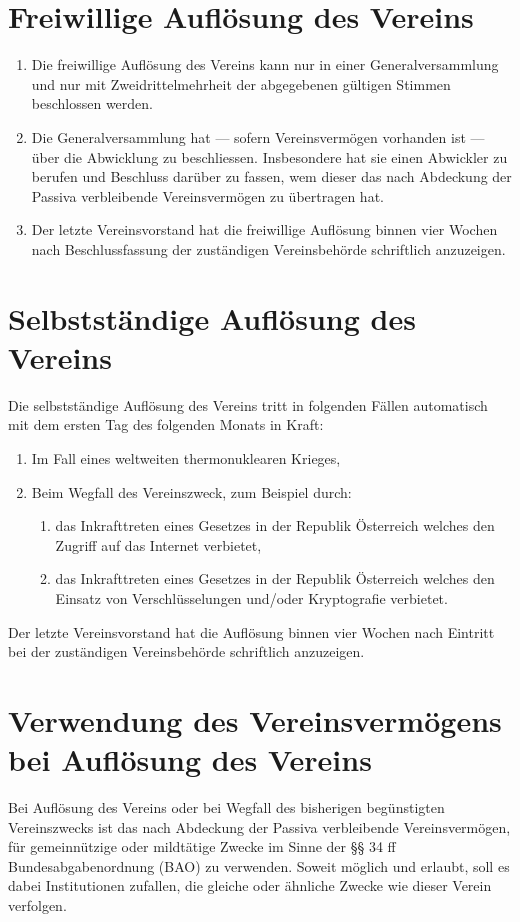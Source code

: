 \documentclass[a4paper,12pt]{article}
\begin{document}
	\section{Freiwillige Auflösung des Vereins}
		\label{sec:freiwillige-aufloesung}
		\begin{enumerate}
			\item Die freiwillige Auflösung des Vereins kann nur in einer Generalversammlung und nur mit Zweidrittelmehrheit der abgegebenen gültigen Stimmen beschlossen werden.
			\item Die Generalversammlung hat --- sofern Vereinsvermögen vorhanden ist --- über die Abwicklung zu beschliessen. Insbesondere hat sie einen Abwickler zu berufen und Beschluss darüber zu fassen, wem dieser das nach Abdeckung der Passiva verbleibende Vereinsvermögen zu übertragen hat.
			\item Der letzte Vereinsvorstand hat die freiwillige Auflösung binnen vier Wochen nach Beschlussfassung der zuständigen Vereinsbehörde schriftlich anzuzeigen.
		\end{enumerate}

	\section{Selbstständige Auflösung des Vereins}
		Die selbstständige Auflösung des Vereins tritt in folgenden Fällen automatisch mit dem ersten Tag des folgenden Monats in Kraft:
		\begin{enumerate}
			\item Im Fall eines weltweiten thermonuklearen Krieges,
			\item Beim Wegfall des Vereinszweck, zum Beispiel durch:
			\begin{enumerate}
				\item das Inkrafttreten eines Gesetzes in der Republik Österreich welches den Zugriff auf das Internet verbietet,
				\item das Inkrafttreten eines Gesetzes in der Republik Österreich welches den Einsatz von Verschlüsselungen und/oder Kryptografie verbietet.
			\end{enumerate}
		\end{enumerate}
		Der letzte Vereinsvorstand hat die Auflösung binnen vier Wochen nach Eintritt bei der zuständigen Vereinsbehörde schriftlich anzuzeigen.
		\label{sec:selbstaendige-aufloesung}

	\section{Verwendung des Vereinsvermögens bei Auflösung des Vereins}
		\label{sec:verwendung-vermoegen}
		Bei Auflösung des Vereins oder bei Wegfall des bisherigen begünstigten Vereinszwecks ist das nach Abdeckung der Passiva verbleibende Vereinsvermögen, für gemeinnützige oder mildtätige Zwecke im Sinne der §§ 34 ff Bundesabgabenordnung (BAO) zu verwenden. Soweit möglich und erlaubt, soll es dabei Institutionen zufallen, die gleiche oder ähnliche Zwecke wie dieser Verein verfolgen.
\end{document}
